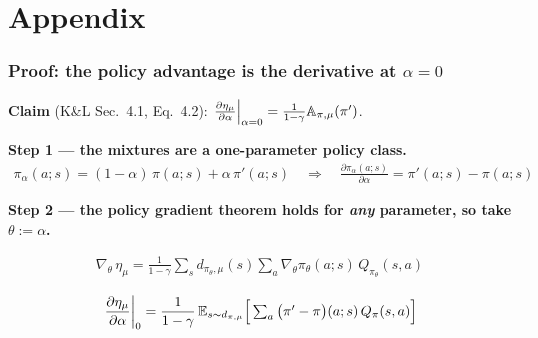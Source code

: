 \part*{Appendix}


\section{Proof: the policy advantage is the derivative at $\alpha=0$}
\label{app:proof-pa}

\textbf{Claim} (K\&L Sec.~4.1, Eq.~4.2): $\left.\frac{\partial\eta_\mu}{\partial\alpha}\right|_{\alpha=0}=\frac{1}{1-\gamma}\mathbb{A}_{\pi,\mu}(\pi')$.

\textbf{Step 1 --- the mixtures are a one-parameter policy class.}
\begin{gather*}
  \pi_\alpha(a;s) = (1-\alpha)\,\pi(a;s) + \alpha\,\pi'(a;s)
  \quad\Longrightarrow\quad
  \frac{\partial\pi_\alpha(a;s)}{\partial\alpha} = \pi'(a;s) - \pi(a;s)
\end{gather*}

\textbf{Step 2 --- the policy gradient theorem holds for \emph{any} parameter, so take $\theta:=\alpha$.}

\begin{pair}
\begin{coolbox}[title={Policy gradient, any $\theta\in\mathbb R^m$}]
\begin{gather*}
  \nabla_\theta\,\eta_\mu = \frac{1}{1-\gamma}\sum_s d_{\pi_\theta,\mu}(s)\sum_a \nabla_\theta\pi_\theta(a;s)\,Q_{\pi_\theta}(s,a)
\end{gather*}
\end{coolbox}
\begin{warmbox}[title={Mixture, at $\alpha=0$ ($\pi_0=\pi$)}]
\begin{gather*}
  \left.\frac{\partial\eta_\mu}{\partial\alpha}\right|_{0} = \frac{1}{1-\gamma}\,\mathbb{E}_{s\sim d_{\pi,\mu}}\Big[\textstyle\sum_a \big(\pi'-\pi\big)(a;s)\,Q_\pi(s,a)\Big]
\end{gather*}
\end{warmbox}
\end{pair}

